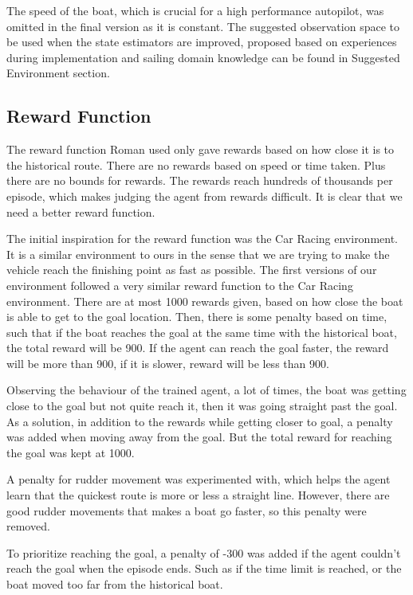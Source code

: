 \documentclass[12pt,twoside]{report}
\begin{document}
The speed of the boat, which is crucial for a high performance autopilot, was omitted in the final version as it is constant. The suggested observation space to be used when the state estimators are improved, proposed based on experiences during implementation and sailing domain knowledge can be found in Suggested Environment section.

\subsection{Reward Function}
The reward function Roman \cite{roman} used only gave rewards based on how close it is to the historical route. There are no rewards based on speed or time taken. Plus there are no bounds for rewards. The rewards reach hundreds of thousands per episode, which makes judging the agent from rewards difficult. It is clear that we need a better reward function.

The initial inspiration for the reward function was the Car Racing \cite{CarRacing-v0} environment. It is a similar environment to ours in the sense that we are trying to make the vehicle reach the finishing point as fast as possible. The first versions of our environment followed a very similar reward function to the Car Racing environment. There are at most 1000 rewards given, based on how close the boat is able to get to the goal location. Then, there is some penalty based on time, such that if the boat reaches the goal at the same time with the historical boat, the total reward will be 900. If the agent can reach the goal faster, the reward will be more than 900, if it is slower, reward will be less than 900.

Observing the behaviour of the trained agent, a lot of times, the boat was getting close to the goal but not quite reach it, then it was going straight past the goal. As a solution, in addition to the rewards while getting closer to goal, a penalty was added when moving away from the goal. But the total reward for reaching the goal was kept at 1000.

A penalty for rudder movement was experimented with, which helps the agent learn that the quickest route is more or less a straight line. However, there are good rudder movements that makes a boat go faster, so this penalty were removed.

To prioritize reaching the goal, a penalty of -300 was added if the agent couldn't reach the goal when the episode ends. Such as if the time limit is reached, or the boat moved too far from the historical boat. 
\end{document}
